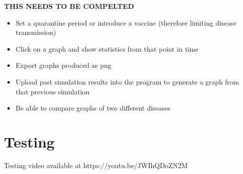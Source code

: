 \documentclass[11pt, a4paper]{article}
\begin{document}
\textbf{THIS NEEDS TO BE COMPELTED}

\begin{itemize}
    \item Set a quarantine period or introduce a vaccine (therefore limiting disease transmission)
    \item Click on a graph and show statistics from that point in time
    \item Export graphs produced as png
    \item Upload past simulation results into the program to generate a graph from that previous simulation
    \item Be able to compare graphs of two different diseases
\end{itemize}

\section{Testing}
Testing video available at https://youtu.be/JWIhQDoZN2M


% 
\end{document}
